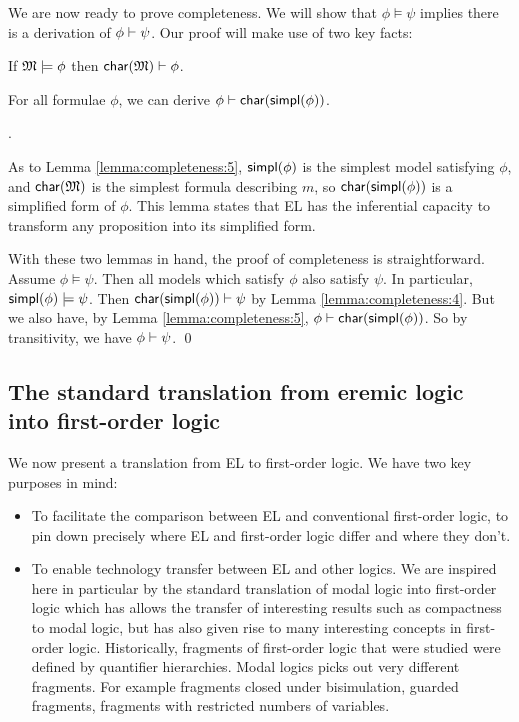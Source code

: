 \NI We are now ready to prove completeness.  We will show that $\phi
\models \psi$ implies there is a derivation of $\phi \vdash \psi$.  Our proof
will make use of two key facts:

\begin{lemma}\label{lemma:completeness:4}
If $\frak{M} \models \phi$ then $\mathsf{char}(\frak{M}) \vdash \phi$.
\end{lemma}

\begin{lemma}\label{lemma:completeness:5}
For all formulae $\phi$, we can derive $\phi \vdash \mathsf{char}(\mathsf{simpl}(\phi))$.
\end{lemma}

.

As to Lemma \ref{lemma:completeness:5}, $\mathsf{simpl}(\phi)$ is the simplest model
satisfying $\phi$, and $\mathsf{char}(\frak{M})$ is the simplest formula describing
$m$, so $\mathsf{char}(\mathsf{simpl}(\phi))$ is a simplified form of $\phi$. This lemma
states that EL has the inferential capacity to transform any
proposition into its simplified form.

With these two lemmas in hand, the proof of completeness is
straightforward.  Assume $\phi \models \psi$.  Then all models which satisfy
$\phi$ also satisfy $\psi$.  In particular, $\mathsf{simpl}(\phi) \models \psi$.  Then
$\mathsf{char}(\mathsf{simpl}(\phi)) \vdash \psi$ by Lemma \ref{lemma:completeness:4}.  But we
also have, by Lemma \ref{lemma:completeness:5}, $\phi \vdash
\mathsf{char}(\mathsf{simpl}(\phi)) $.  So by transitivity, we have $\phi \vdash \psi$.  \qed


\subsection{The standard translation from  eremic logic into 
            first-order logic}\label{standardTranslation}

We now present a translation from EL to first-order logic. We have two
key purposes in mind:

\begin{itemize}

\item To facilitate the comparison between EL and conventional
  first-order logic, to pin down precisely where EL and first-order
  logic differ and where they don't.

\item To enable technology transfer between EL and other logics. We
  are inspired here in particular by the standard translation of modal
  logic into first-order logic \cite{BlackburnP:modlog} which has
  allows the transfer of interesting results such as compactness to
  modal logic, but has also given rise to many interesting concepts in
  first-order logic.  Historically, fragments of first-order logic
  that were studied were defined by quantifier hierarchies. Modal
  logics picks out very different fragments. For example fragments
  closed under bisimulation, guarded fragments, fragments with
  restricted numbers of variables.

\end{itemize}

